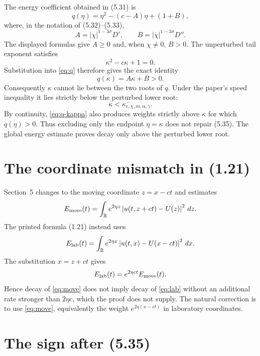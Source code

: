 \documentclass[11pt]{article}
\newcommand{\R}{\mathbb{R}}
\newcommand{\abs}[1]{\left\lvert #1\right\rvert}
\begin{document}
The energy coefficient obtained in (5.31) is
\begin{equation}
 q(\eta)=\eta^{2}-(c-A)\eta+(1+B),
 \label{eq:q}
\end{equation}
where, in the notation of (5.32)--(5.33),
\[
 A=\abs{\chi}^{1-3\sigma}D',
 \qquad
 B=\abs{\chi}^{1-3\sigma}D''.
\]
The displayed formulas give $A\geq0$ and, when $\chi\neq0$, $B>0$.
The unperturbed tail exponent satisfies
\[
  \kappa^{2}-c\kappa+1=0.
\]
Substitution into \eqref{eq:q} therefore gives the exact identity
\begin{equation}
  q(\kappa)=A\kappa+B>0.
  \label{eq:q-kappa}
\end{equation}
Consequently $\kappa$ cannot lie between the two roots of $q$.  Under the
paper's speed inequality it lies strictly below the perturbed lower root:
\[
  \kappa<\kappa^{-}_{c,\chi,m,\alpha,\gamma}.
\]
By continuity, \eqref{eq:q-kappa} also produces weights strictly above
$\kappa$ for which $q(\eta)>0$.  Thus excluding only the endpoint
$\eta=\kappa$ does not repair (5.35).  The global energy estimate proves
decay only above the perturbed lower root.

\section{The coordinate mismatch in (1.21)}

Section~5 changes to the moving coordinate $z=x-ct$ and estimates
\begin{equation}
 E_{\rm move}(t)=\int_{\R}e^{2\eta z}
   \abs{u(t,z+ct)-U(z)}^{2}\,dz.
 \label{eq:move}
\end{equation}
The printed formula (1.21) instead uses
\begin{equation}
 E_{\rm lab}(t)=\int_{\R}e^{2\eta x}
   \abs{u(t,x)-U(x-ct)}^{2}\,dx.
 \label{eq:lab}
\end{equation}
The substitution $x=z+ct$ gives
\begin{equation}
 E_{\rm lab}(t)=e^{2\eta ct}E_{\rm move}(t).
 \label{eq:change}
\end{equation}
Hence decay of \eqref{eq:move} does not imply decay of \eqref{eq:lab} without
an additional rate stronger than $2\eta c$, which the proof does not supply.
The natural correction is to use \eqref{eq:move}, equivalently the weight
$e^{2\eta(x-ct)}$ in laboratory coordinates.

\section{The sign after (5.35)}
\end{document}
